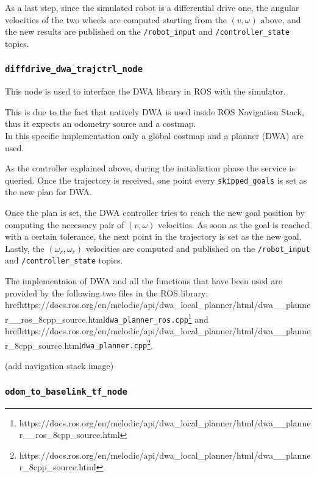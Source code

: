 \documentclass[11pt,a4paper]{article}
\begin{document}
As a last step, since the simulated robot is a differential drive one, the angular velocities of the two wheels are computed starting from the $(v, \omega)$ above, and the new results are published on the \texttt{/robot\_input} and \texttt{/controller\_state} topics.

\subsubsection{\texttt{diffdrive\_dwa\_trajctrl\_node}}

This node is used to interface the DWA library in ROS with the simulator.

This is due to the fact that natively DWA is used inside ROS Navigation Stack, thus it expects an odometry source and a costmap.\\

In this specific implementation only a global costmap and a planner (DWA) are used.

As the controller explained above, during the initialiation phase the service is queried. Once the trajectory is received, one point every \texttt{skipped\_goals} is set as the new plan for DWA.

Once the plan is set, the DWA controller tries to reach the new goal position by computing the necessary pair of $(v, \omega)$ velocities. As soon as the goal is reached with a certain tolerance, the next point in the trajectory is set as the new goal.\\

Lastly, the $(\omega_r,\omega_r)$ velocities are computed and published on the \texttt{/robot\_input} and \texttt{/controller\_state} topics.

The implementaion of DWA and all the functions that have been used are provided by the following two files in the ROS library:
href{https://docs.ros.org/en/melodic/api/dwa\_local\_planner/html/dwa\_\_planner\_\_ros\_8cpp\_source.html}{\texttt{dwa\_planner\_ros.cpp}}\footnote{https://docs.ros.org/en/melodic/api/dwa\_local\_planner/html/dwa\_\_planner\_\_ros\_8cpp\_source.html} and href{https://docs.ros.org/en/melodic/api/dwa\_local\_planner/html/dwa\_\_planner\_8cpp\_source.html}{\texttt{dwa\_planner.cpp}}\footnote{https://docs.ros.org/en/melodic/api/dwa\_local\_planner/html/dwa\_\_planner\_8cpp\_source.html}.

(add navigation stack image)

\subsubsection{\texttt{odom\_to\_baselink\_tf\_node}}
\end{document}

